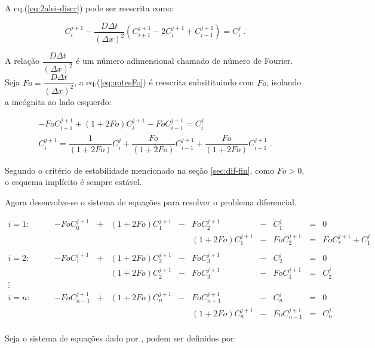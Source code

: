 A eq.(\ref{eq:2alei-discr}) pode ser reescrita como:

\begin{equation}
\label{eq:antesFo}
C_i^{j+1} - \frac{D\Delta t}{(\Delta x)^2} (C_{i+1}^{j+1} - 2C_i^{j+1} + C_{i-1}^{j+1}) = C_i^j \;.
\end{equation}

A relação $\dfrac{D\Delta t}{(\Delta x)^2}$ é um número adimensional chamado de número de Fourier. Seja $Fo = \dfrac{D\Delta t}{(\Delta x)^2} $, a eq.(\ref{eq:antesFo}) é reescrita subsitituindo com $Fo$, isolando a incógnita ao lado esquerdo:

\begin{gather*}
\label{eq:depoisFo}
- FoC_{i+1}^{j+1} + (1+2Fo)C_i^{j+1} - FoC_{i-1}^{j+1} = C_i^j \\
C_i^{j+1} = \dfrac{1}{(1+2Fo)}C_i^j + \dfrac{Fo}{(1+2Fo)}C_{i-1}^{j+1} + \dfrac{Fo}{(1+2Fo)}C_{i+1}^{j+1} \;.
\end{gather*}

Segundo o critério de estabilidade mencionado na seção \ref{sec:dif-fin}, como $Fo>0$, o esquema implícito é sempre estável.

Agora desenvolve-se o sistema de equações para resolver o problema diferencial.

\begin{equation*}
\label{eq:depoisFo}
\begin{matrix}
i = 1: \qquad & -FoC_{0}^{j+1}   & + & (1+2Fo)C_1^{j+1} & - & FoC_{2}^{j+1} & - & C_1^j & = & 0\\
              &&&&& (1+2Fo)C_1^{j+1} & - & FoC_{2}^{j+1} & = & FoC_{s}^{j+1}  + C_1^j \\ 
\\
i = 2: \qquad & -FoC_{1}^{j+1} & + & (1+2Fo)C_2^{j+1} & - & FoC_{3}^{j+1} & - & C_2^j & = & 0\\
              &&& (1+2Fo)C_2^{j+1} & - & FoC_{3}^{j+1} & - & FoC_{1}^{j+1} & = & C_2^j \\ 
\vdots \\
i = n: \qquad & -FoC_{n-1}^{j+1} & + & (1+2Fo)C_n^{j+1} & - & FoC_{n+1}^{j+1} & - & C_n^j & = & 0\\
              &&&&& (1+2Fo)C_n^{j+1} & - & FoC_{n-1}^{j+1} & = & C_n^j \\ 
\end{matrix}
\end{equation*}

Seja o sistema de equações dado por ,  podem ser definidos por:

